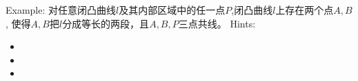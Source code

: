 \clearpage
Example: 对任意闭凸曲线$l$及其内部区域中的任一点$P$,闭凸曲线$l$上存在两个点$A,B$,
使得$A,B$把$l$分成等长的两段，且$A,B,P$三点共线。 
\clearpage
Hints:
\begin{itemize}
\item 
\item 
\item 
\end{itemize}



